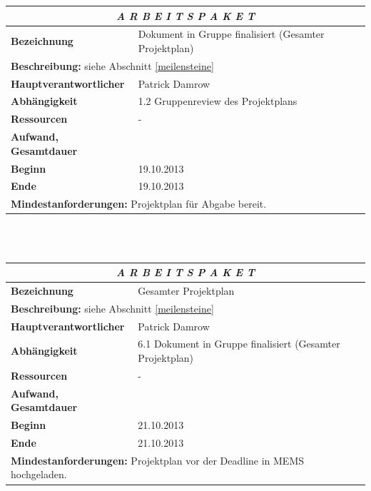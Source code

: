 \documentclass[fontsize=12pt,paper=a4,twoside]{scrartcl}
\begin{document}
\begin{tabular}{p{7.5cm}|p{7.5cm}}\toprule
\multicolumn{2}{c}{\textbf{\textit{A R B E I T S P A K E T \quad 6.1}}} \\ \toprule \hline
\textbf{Bezeichnung} & Dokument in Gruppe finalisiert (Gesamter Projektplan)\\\hline
\multicolumn{2}{p{15cm}}{\textbf{Beschreibung:} \newline 
siehe Abschnitt \ref{meilensteine} }  \\\hline
\textbf{Hauptverantwortlicher} & Patrick Damrow \\\hline
\textbf{Abhängigkeit} & 1.2 Gruppenreview des Projektplans\\\hline
\textbf{Ressourcen} & -\\\hline
\textbf{Aufwand, Gesamtdauer} & \\\hline
\textbf{Beginn} & 19.10.2013 \\\hline
\textbf{Ende} & 19.10.2013\\\hline
\multicolumn{2}{p{15cm}}{\textbf{Mindestanforderungen: } \newline
Projektplan für Abgabe bereit.}  \\ \toprule
\end{tabular} \\\\

\begin{tabular}{p{7.5cm}|p{7.5cm}}\toprule
\multicolumn{2}{c}{\textbf{\textit{A R B E I T S P A K E T \quad 6.2}}} \\ \toprule \hline
\textbf{Bezeichnung} & Gesamter Projektplan\\\hline
\multicolumn{2}{p{15cm}}{\textbf{Beschreibung:} \newline 
siehe Abschnitt \ref{meilensteine} }  \\\hline
\textbf{Hauptverantwortlicher} & Patrick Damrow \\\hline
\textbf{Abhängigkeit} & 6.1 Dokument in Gruppe finalisiert (Gesamter Projektplan)\\\hline
\textbf{Ressourcen} & -\\\hline
\textbf{Aufwand, Gesamtdauer} & \\\hline
\textbf{Beginn} & 21.10.2013 \\\hline
\textbf{Ende} & 21.10.2013\\\hline
\multicolumn{2}{p{15cm}}{\textbf{Mindestanforderungen: } \newline
Projektplan vor der Deadline in MEMS hochgeladen.}  \\ \toprule
\end{tabular} \\\\
\end{document}
